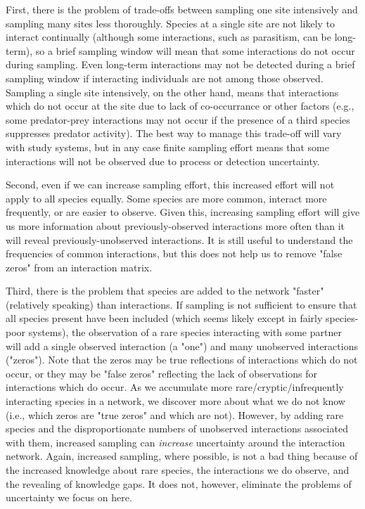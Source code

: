 \documentclass[12pt]{article}
\begin{document}
First, there is the problem of trade-offs between sampling one site intensively and sampling many sites less thoroughly. Species at a single site are not likely to interact continually (although some interactions, such as parasitism, can be long-term), so a brief sampling window will mean that some interactions do not occur during sampling. Even long-term interactions may not be detected during a brief sampling window if interacting individuals are not among those observed. Sampling a single site intensively, on the other hand, means that interactions which do not occur at the site due to lack of co-occurrance or other factors (e.g., some predator-prey interactions may not occur if the presence of a third species suppresses predator activity). The best way to manage this trade-off will vary with study systems, but in any case finite sampling effort means that some interactions will not be observed due to process or detection uncertainty.

Second, even if we can increase sampling effort, this increased effort will not apply to all species equally. Some species are more common, interact more frequently, or are easier to observe. Given this, increasing sampling effort will give us more information about previously-observed interactions more often than it will reveal previously-unobserved interactions. It is still useful to understand the frequencies of common interactions, but this does not help us to remove "false zeros" from an interaction matrix.

Third, there is the problem that species are added to the network "faster" (relatively speaking) than interactions. If sampling is not sufficient to ensure that all species present have been included (which seems likely except in fairly species-poor systems), the observation of a rare species interacting with some partner will add a single observed interaction (a "one") and many unobserved interactions ("zeros"). Note that the zeros may be true reflections of interactions which do not occur, or they may be "false zeros" reflecting the lack of observations for interactions which do occur. As we accumulate more rare/cryptic/infrequently interacting species in a network, we discover more about what we do not know (i.e., which zeros are "true zeros" and which are not). However, by adding rare species and the disproportionate numbers of unobserved interactions associated with them, increased sampling can \emph{increase} uncertainty around the interaction network. Again, increased sampling, where possible, is not a bad thing because of the increased knowledge about rare species, the interactions we do observe, and the revealing of knowledge gaps. It does not, however, eliminate the problems of uncertainty we focus on here.
\end{document}
